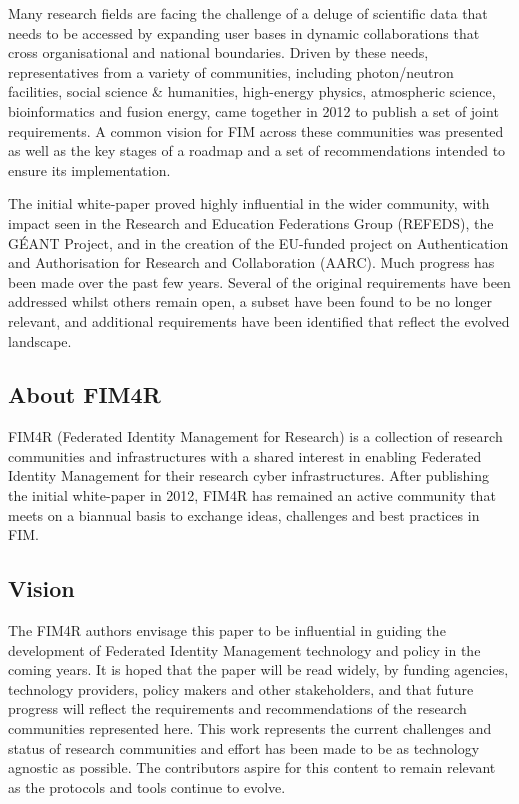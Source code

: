 \documentclass[fleqn,11pt]{wlscirep}
\begin{document}
{Many research fields are facing the challenge of a deluge of scientific data that needs to be accessed by expanding user bases in dynamic collaborations that cross organisational and national boundaries. Driven by these needs, representatives from a variety of communities, including photon/neutron facilities, social science \& humanities, high-energy physics, atmospheric science, bioinformatics and fusion energy, came together in 2012 to publish a set of joint requirements. A common vision for FIM across these communities was presented as well as the key stages of a roadmap and a set of recommendations intended to ensure its implementation. 

The initial white-paper proved highly influential in the wider community, with impact seen in the Research and Education Federations Group (REFEDS)\cite{refeds}, the GÉANT Project\cite{GN4}, and in the creation of the EU-funded project on Authentication and Authorisation for Research and Collaboration (AARC)\cite{aarc}. Much progress has been made over the past few years. Several of the original requirements have been addressed whilst others remain open, a subset have been found to be no longer relevant, and additional requirements have been identified that reflect the evolved landscape. 

\subsection{About FIM4R}
FIM4R\cite{fim4rweb} (Federated Identity Management for Research) is a collection of research communities and infrastructures with a shared interest in enabling Federated Identity Management for their research cyber infrastructures. After publishing the initial white-paper in 2012, FIM4R has remained an active community that meets on a biannual basis to exchange ideas, challenges and best practices in FIM.  

\subsection{Vision}
The FIM4R authors envisage this paper to be influential in guiding the development of Federated Identity Management technology and policy in the coming years. It is hoped that the paper will be read widely, by funding agencies, technology providers, policy makers and other stakeholders, and that future progress will reflect the requirements and recommendations of the research communities represented here. This work represents the current challenges and status of research communities and effort has been made to be as technology agnostic as possible. The contributors aspire for this content to remain relevant as the protocols and tools continue to evolve. 

}
\end{document}
